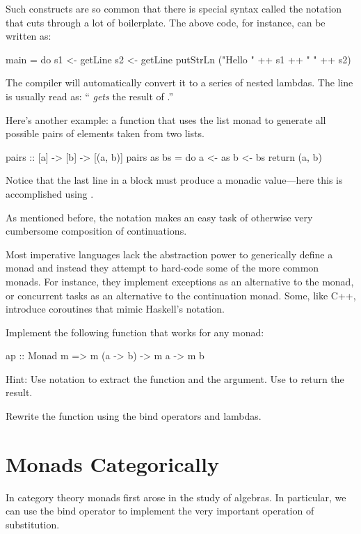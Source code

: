 \documentclass[DaoFP]{subfiles}
\begin{document}
Such constructs are so common that there is special syntax called the  notation that cuts through a lot of boilerplate. The above code, for instance, can be written as:
\begin{haskell}
main = do
  s1 <- getLine
  s2 <- getLine
  putStrLn ("Hello " ++ s1 ++ " " ++ s2)
\end{haskell}
The compiler will automatically convert it to a series of nested lambdas. The line  is usually read as: `` \emph{gets} the result of .''

Here's another example: a function that uses the list monad to generate all possible pairs of elements taken from two lists.
\begin{haskell}
pairs :: [a] -> [b] -> [(a, b)]
pairs as bs = do
  a <- as
  b <- bs
  return (a, b)
\end{haskell}
Notice that the last line in a  block must produce a monadic value---here this is accomplished using .


As mentioned before, the  notation makes an easy task of otherwise very cumbersome composition of continuations.

Most imperative languages lack the abstraction power to generically define a monad and instead they attempt to hard-code some of the more common monads. For instance, they implement exceptions as an alternative to the  monad, or concurrent tasks as an alternative to the continuation monad. Some, like C++, introduce coroutines that mimic Haskell's  notation. 

\begin{exercise}
Implement the following function that works for any monad:
\begin{haskell}
ap :: Monad m => m (a -> b) -> m a -> m b
\end{haskell}
Hint: Use  notation to extract the function and the argument. Use  to return the result.
\end{exercise}

\begin{exercise}
Rewrite the  function using the bind operators and lambdas.
\end{exercise}

\section{Monads Categorically}

In category theory monads first arose in the study of algebras. In particular, we can use the bind operator to implement the very important operation of substitution. 
\end{document}
